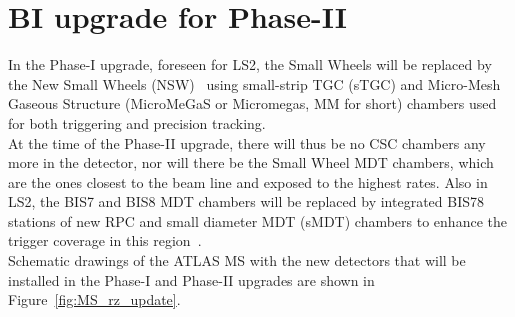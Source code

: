 \section {BI upgrade for Phase-II}
\label{BI_upg}
In the Phase-I upgrade, foreseen for LS2, the Small Wheels will be replaced by the New Small Wheels (NSW)~\cite{NSW} using small-strip TGC (sTGC) and Micro-Mesh Gaseous Structure
(MicroMeGaS or Micromegas, MM for short) chambers used for both triggering and precision tracking.\\
At the time of the Phase-II upgrade, there will thus be no CSC chambers
any more in the detector, nor will there be the Small Wheel MDT chambers, which are the ones closest to the beam line and exposed to the highest rates. Also in LS2, the BIS7 and
BIS8 MDT chambers will be replaced by integrated BIS78 stations of new RPC and small diameter MDT (sMDT) chambers to enhance the trigger coverage in this region~\cite{BIS78}.\\
Schematic drawings of the ATLAS MS with the new detectors that will be installed in the Phase-I and Phase-II upgrades are shown in Figure~\ref{fig:MS_rz_update}.\\
